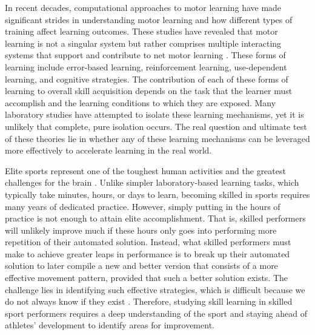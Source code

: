 In recent decades, computational approaches to motor learning have made significant strides in understanding motor learning and how different types of training affect learning outcomes. These studies have revealed that motor learning is not a singular system but rather comprises multiple interacting systems that support and contribute to net motor learning \cite{haith_model-based_2013, uehara_learning_2018}. These forms of learning include error-based learning, reinforcement learning, use-dependent learning, and cognitive strategies. The contribution of each of these forms of learning to overall skill acquisition depends on the task that the learner must accomplish and the learning conditions to which they are exposed. Many laboratory studies have attempted to isolate these learning mechanisms, yet it is unlikely that complete, pure isolation occurs. The real question and ultimate test of these theories lie in whether any of these learning mechanisms can be leveraged more effectively to accelerate learning in the real world.

Elite sports represent one of the toughest human activities and the greatest challenges for the brain \cite{walsh_is_2014}. Unlike simpler laboratory-based learning tasks, which typically take minutes, hours, or days to learn, becoming skilled in sports requires many years of dedicated practice.  However, simply putting in the hours of practice is not enough to attain elite accomplishment. That is, skilled performers will unlikely improve much if these hours only goes into performing more repetition of their automated solution. Instead, what skilled performers must make to achieve greater leaps in performance is to break up their automated solution to later compile a new and better version that consists of a more effective movement pattern, provided that such a better solution exists. The challenge lies in identifying such effective strategies, which is difficult because we do not always know if they exist \cite{gray_plateaus_2017}. Therefore, studying skill learning in skilled sport performers requires a deep understanding of the sport and staying ahead of athletes' development to identify areas for improvement. 


